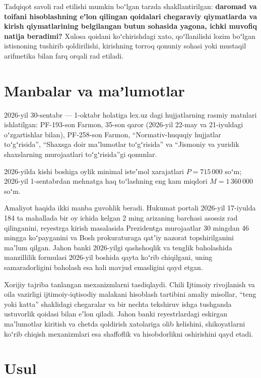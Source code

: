 \documentclass[12pt,a4paper]{extarticle}
\begin{document}
Tadqiqot savoli rad etilishi mumkin boʻlgan tarzda shakllantirilgan: \textbf{daromad va toifani hisoblashning eʼlon qilingan qoidalari chegaraviy qiymatlarda va kirish qiymatlarining belgilangan butun sohasida yagona, ichki muvofiq natija beradimi?} Xulosa qoidani koʻchirishdagi xato, qoʻllanilishi lozim boʻlgan istisnoning tushirib qoldirilishi, kirishning torroq qonuniy sohasi yoki mustaqil arifmetika bilan farq orqali rad etiladi.

\section{Manbalar va maʼlumotlar}
2026-yil 30-sentabr — 1-oktabr holatiga lex.uz dagi hujjatlarning rasmiy matnlari ishlatilgan: PF-193-son Farmon, 35-son qaror (2026-yil 22-may va 21-iyuldagi oʻzgartishlar bilan), PF-258-son Farmon, “Normativ-huquqiy hujjatlar toʻgʻrisida”, “Shaxsga doir maʼlumotlar toʻgʻrisida” va “Jismoniy va yuridik shaxslarning murojaatlari toʻgʻrisida”gi qonunlar\cite{ref1,ref2,ref3,ref7,ref9,ref20}.

2026-yilda kishi boshiga oylik minimal isteʼmol xarajatlari $P=715\,000$ soʻm\cite{ref5}; 2026-yil 1-sentabrdan mehnatga haq toʻlashning eng kam miqdori $M=1\,360\,000$ soʻm\cite{ref4}.

Amaliyot haqida ikki manba guvohlik beradi. Hukumat portali 2026-yil 17-iyulda 184 ta mahallada bir oy ichida kelgan 2 ming arizaning barchasi asossiz rad qilinganini, reyestrga kirish masalasida Prezidentga murojaatlar 30 mingdan 46 mingga koʻpayganini va Bosh prokuraturaga qatʼiy nazorat topshirilganini maʼlum qilgan\cite{ref28}. Jahon banki 2026-yilgi qashshoqlik va tenglik baholashida manzillilik formulasi 2026-yil boshida qayta koʻrib chiqilgani, uning samaradorligini baholash esa hali mavjud emasligini qayd etgan\cite{ref11}.

Xorijiy tajriba tanlangan mexanizmlarni tasdiqlaydi. Chili Ijtimoiy rivojlanish va oila vazirligi ijtimoiy-iqtisodiy malakani hisoblash tartibini amaliy misollar, “teng yoki katta” shaklidagi chegaralar va bir nechta tekshiruv ishga tushganda ustuvorlik qoidasi bilan eʼlon qiladi\cite{ref32}. Jahon banki reyestrlardagi eskirgan maʼlumotlar kiritish va chetda qoldirish xatolariga olib kelishini, shikoyatlarni koʻrib chiqish mexanizmlari esa shaffoflik va hisobdorlikni oshirishini qayd etadi\cite{ref12}.

\section{Usul}
\end{document}
